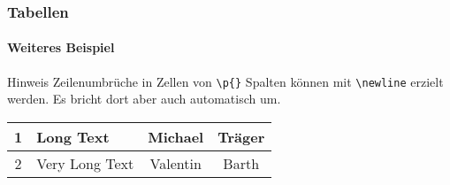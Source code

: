 

\begin{frame}[t]

\frametitle{Tabellen}
\framesubtitle{Weiteres Beispiel}

\begin{block}{Hinweis}
Zeilenumbrüche in Zellen von \texttt{\color{nounibaredI}\textbackslash p\color{black}\{\}} Spalten können mit \texttt{\color{nounibaredI}\textbackslash newline\color{black}} erzielt werden. Es bricht dort aber auch automatisch um.
\end{block}

\medskip

\begin{footnotesize}
\begin{ttfamily}

\end{ttfamily}
\end{footnotesize}

\medskip

\begin{tabular}{|c|p{20mm}|c|c|}
\hline
1 & Long \newline Text & Michael & Träger \\
\hline
2 & Very Long Text & Valentin & Barth \\
\hline
\end{tabular}

\end{frame}




